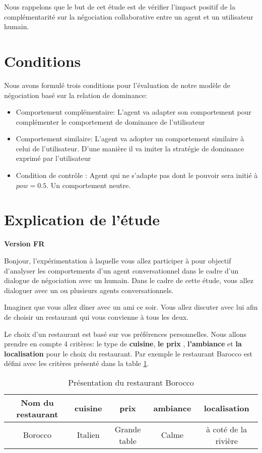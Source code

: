 \documentclass [french]{paper}
\begin{document}
		
		Nous rappelons que le but de cet étude est de vérifier l'impact positif de la complémentarité sur la négociation collaborative entre un agent et un utilisateur humain. 
		
		\section{Conditions}
		
			Nous avons formulé trois conditions pour l'évaluation de notre modèle de négociation basé sur la relation de dominance: 
			\begin{itemize}
				\item Comportement complémentaire: L'agent va adapter son comportement pour complémenter le comportement de dominance de l'utilisateur
				
				\item Comportement similaire: L'agent va adopter un comportement similaire à celui de l'utilisateur. D'une manière il va imiter la stratégie de dominance exprimé par l'utilisateur
				
				\item Condition de contrôle : Agent qui ne s'adapte pas dont le pouvoir sera initié à $pow =0.5$. Un comportement neutre. 
			\end{itemize}
			
			
		\section{Explication de l'étude}
			\textbf{ Version FR}

		Bonjour, l’expérimentation à laquelle vous allez participer à pour objectif d'analyser les comportements d’un agent conversationnel dans le cadre d’un dialogue de négociation avec un humain.
		Dans le cadre de cette étude, vous allez dialoguer avec un ou plusieurs agents conversationnels.
		
		Imaginez que vous allez dîner avec un ami ce soir. Vous allez discuter avec lui afin de choisir un restaurant qui vous convienne à tous les deux.
	
		Le choix d'un restaurant est basé sur vos préférences personnelles. Nous allons prendre en compte 4 critères: le type de \textbf{cuisine}, \textbf{le prix} , \textbf{l'ambiance} et \textbf{la localisation} pour le choix du restaurant. Par exemple le restaurant Barocco est défini avec les critères présenté dans la table \ref{teb:ex}.
			\begin{table}[h]
			\begin{tabular} {|c|c|c|c|c|}
				\hline
				Nom du restaurant & cuisine & prix & ambiance& localisation \\
				\hline
				Borocco & Italien & Grande table & Calme & à coté de la rivière \\
				\hline 
			\end{tabular}
			\label{teb:ex}
			\caption{Présentation du restaurant Borocco}
		\end{table}
		
\end{document}
